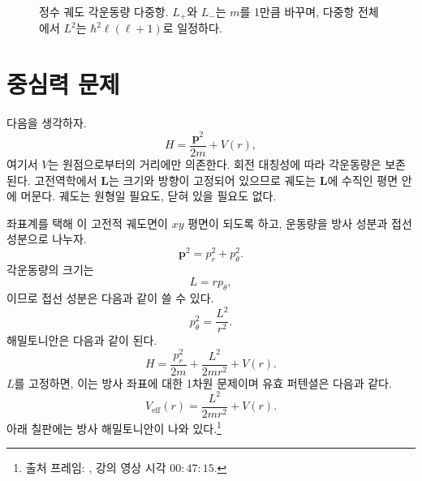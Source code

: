 \begin{figure}[htbp]\centering
{}\caption{정수 궤도 각운동량 다중항. \(L_+\)와 \(L_-\)는 \(m\)를 1만큼 바꾸며, 다중항 전체에서 \(L^2\)는 \(\hbar^2\ell(\ell+1)\)로 일정하다.}\end{figure}

\section{중심력 문제}

다음을 생각하자.
\begin{equation}
H=\frac{\mathbf p^2}{2m}+V(r),
\end{equation}
여기서 \(V\)는 원점으로부터의 거리에만 의존한다. 회전 대칭성에 따라 각운동량은 보존된다. 고전역학에서 \(\mathbf L\)는 크기와 방향이 고정되어 있으므로 궤도는 \(\mathbf L\)에 수직인 평면 안에 머문다. 궤도는 원형일 필요도, 닫혀 있을 필요도 없다.

좌표계를 택해 이 고전적 궤도면이 \(xy\) 평면이 되도록 하고, 운동량을 방사 성분과 접선 성분으로 나누자.
\begin{equation}
\mathbf p^2=p_r^2+p_\theta^2.
\end{equation}
각운동량의 크기는
\begin{equation}
L=r p_\theta,
\end{equation}
이므로 접선 성분은 다음과 같이 쓸 수 있다.
\begin{equation}
p_\theta^2=\frac{L^2}{r^2}.
\end{equation}
해밀토니안은 다음과 같이 된다.
\begin{equation}
H=\frac{p_r^2}{2m}+\frac{L^2}{2mr^2}+V(r).
\end{equation}
\(L\)를 고정하면, 이는 방사 좌표에 대한 1차원 문제이며 유효 퍼텐셜은 다음과 같다.
\begin{equation}
V_{\mathrm{eff}}(r)=\frac{L^2}{2mr^2}+V(r).
\end{equation}
아래 칠판에는 방사 해밀토니안이 나와 있다.\footnote{출처 프레임: \texttt{}, 강의 영상 시각 \(00{:}47{:}15\).}

